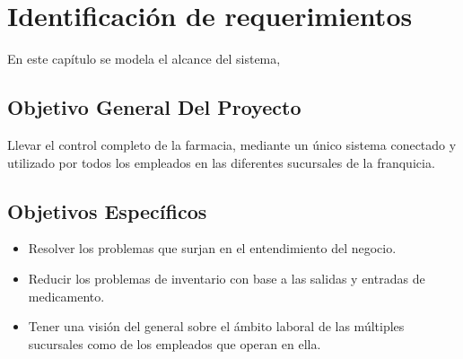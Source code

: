 \chapter{Identificación de requerimientos}
\label{cap:reqUsr}

	En este capítulo se modela el alcance del sistema,
	

\section{Objetivo General Del Proyecto}
Llevar  el  control  completo  de  la  farmacia,  mediante  un   único  sistema  conectado  y utilizado por todos los empleados en las diferentes sucursales de la franquicia.
\section{Objetivos Específicos}
\begin{itemize}
\item Resolver los problemas que surjan en el entendimiento del negocio.

\item Reducir los problemas de inventario con base a las salidas  y entradas de medicamento.

\item Tener una visión del general sobre el ámbito laboral de las múltiples sucursales como de los empleados que operan en ella.

\end{itemize}

